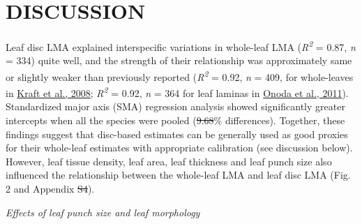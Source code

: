 \documentclass[
  12pt,
  a4paper,
,tablecaptionabove
]{scrartcl}
\providecommand{\DIFaddtex}[1]{{\protect\color{blue}\uwave{#1}}} %
\providecommand{\DIFdeltex}[1]{{\protect\color{red}\sout{#1}}}                      %
\providecommand{\DIFaddbegin}{} %
\providecommand{\DIFaddend}{} %
\providecommand{\DIFdelbegin}{} %
\providecommand{\DIFdelend}{} %
\providecommand{\DIFadd}[1]{\texorpdfstring{\DIFaddtex{#1}}{#1}} %
\providecommand{\DIFdel}[1]{\texorpdfstring{\DIFdeltex{#1}}{}} %
\begin{document}
\hypertarget{discussion}{%
\section{DISCUSSION}\label{discussion}}

Leaf disc LMA explained interspecific variations in whole-leaf LMA (\emph{R\textsuperscript{2}} = 0.87, \emph{n} = 334) quite well, and the strength of their relationship was approximately same or slightly weaker than previously reported (\emph{R\textsuperscript{2}} = 0.92, \emph{n} = 409, for whole-leaves in \protect\hyperlink{ref-Kraft2008}{Kraft et al., 2008}; \emph{R\textsuperscript{2}} = 0.92, \emph{n} = 364 for leaf laminas in \protect\hyperlink{ref-Onoda2011}{Onoda et al., 2011}).
Standardized major axis (SMA) regression analysis showed significantly greater intercepts when all the species were pooled (\DIFdelbegin \DIFdel{9.68}\DIFdelend \DIFaddbegin \DIFadd{9.69}\DIFaddend \% differences).
Together, these findings suggest that disc-based estimates can be generally used as good proxies for their whole-leaf estimates with appropriate calibration (see discussion below).
However, leaf tissue density, leaf area, leaf thickness and leaf punch size also influenced the relationship between the whole-leaf LMA and leaf disc LMA (Fig. 2 and Appendix \DIFdelbegin \DIFdel{S4}\DIFdelend \DIFaddbegin \DIFadd{S1, Figure S3}\DIFaddend ).

\emph{Effects of leaf punch size and leaf morphology}
\end{document}
